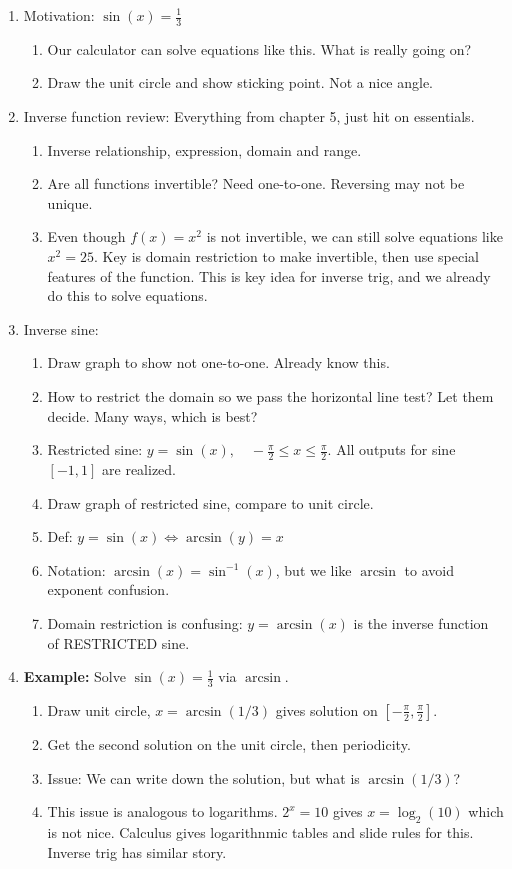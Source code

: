 \documentclass{article}
\begin{document}
\begin{enumerate}
\item Motivation: $\sin(x)=\frac{1}{3}$
\begin{enumerate}
\item Our calculator can solve equations like this. What is really going on?
\item Draw the unit circle and show sticking point. Not a nice angle. 
\end{enumerate}

\item Inverse function review: Everything from chapter 5, just hit on essentials.
\begin{enumerate}
\item Inverse relationship, expression, domain and range.
\item Are all functions invertible? Need one-to-one. Reversing may not be unique.
\item Even though $f(x)=x^2$ is not invertible, we can still solve equations like $x^2=25$. Key is domain restriction to make invertible, then use special features of the function. This is key idea for inverse trig, and we already do this to solve equations.
\end{enumerate}

\item Inverse sine:
\begin{enumerate}
\item Draw graph to show not one-to-one. Already know this.
\item How to restrict the domain so we pass the horizontal line test? Let them decide. Many ways, which is best?
\item Restricted sine: $y=\sin(x), \quad -\frac{\pi}{2}\leq x \leq \frac{\pi}{2}$. All outputs for sine $[-1,1]$ are realized.
\item Draw graph of restricted sine, compare to unit circle.
\item Def: $y = \sin(x) \Leftrightarrow \arcsin(y)=x$
\item Notation: $\arcsin(x)=\sin^{-1}(x)$, but we like $\arcsin$ to avoid exponent confusion.
\item Domain restriction is confusing: $y = \arcsin(x)$ is the inverse function of RESTRICTED sine.
\end{enumerate}

\item {\bf Example:} Solve $\sin(x) = \frac{1}{3}$ via $\arcsin$.
\begin{enumerate}
\item Draw unit circle, $x=\arcsin(1/3)$ gives solution on $[-\frac{\pi}{2},\frac{\pi}{2}]$.
\item Get the second solution on the unit circle, then periodicity.
\item Issue: We can write down the solution, but what is $\arcsin(1/3)$?
\item This issue is analogous to logarithms. $2^x=10$ gives $x=\log_2(10)$ which is not nice. Calculus gives logarithnmic tables and slide rules for this. Inverse trig has similar story.
\end{enumerate}


\end{enumerate}
\end{document}
